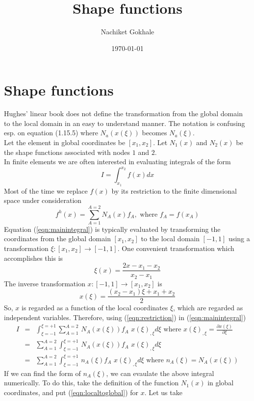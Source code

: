 \documentclass{article}
\newcommand{\beq}{\begin{equation}}
\newcommand{\eeq}{\end{equation}}
\newcommand{\ber}{\begin{eqnarray}}
\newcommand{\eer}{\end{eqnarray}}
\begin{document}
\title{Shape functions}
\author{Nachiket Gokhale}
\date{\today}
\maketitle
\section{Shape functions}
Hughes' linear book does not define the transformation from the global domain to the local domain in an easy to understand manner. The notation is confusing esp. on equation (1.15.5) where $N_a(x(\xi))$ becomes $N_a(\xi)$. \\
Let the element in global coordinates be $[x_1,x_2]$. Let $N_1(x)$ and $N_2(x)$ be the shape functions associated with nodes $1$ and $2$. \\
In finite elements we are often interested in evaluating integrals of the form
\begin{equation}
  \label{eqn:mainintegral}
  I=\int_{x_1}^{x_2}f(x)dx
\end{equation}
Most of the time we replace $f(x)$ by its restriction to the finite dimensional space under consideration
\begin{equation}
  \label{eqn:restriction}
f^h(x)=\sum_{A=1}^{A=2}N_{A}(x)f_{A},\text{ where } f_A=f(x_A)
\end{equation}
Equation (\ref{eqn:mainintegral}) is typically evaluated by transforming the coordinates from the global domain $[x_1,x_2]$ to the local domain $[-1,1]$ using a transformation $\xi:[x_1,x_2]\rightarrow[-1,1]$. One convenient transformation which accomplishes this is
\beq
\label{eqn:globaltolocal}
\xi(x) = \frac{2x -x_1 - x_2}{x_2-x_1}
\eeq
The inverse transformation $x:[-1,1]\rightarrow[x_1,x_2]$ is
\beq
\label{eqn:localtoglobal}
x(\xi) = \frac{(x_2 - x_1)\xi + x_1 + x_2}{2}
\eeq
So, $x$ is regarded as a function of the local coordinates $\xi$, which are regarded as independent variables. Therefore, using (\ref{eqn:restriction}) in (\ref{eqn:mainintegral})
\ber
I &=& \int_{\xi=-1}^{\xi=+1}\sum_{A=1}^{A=2}\,N_{A}(x(\xi))f_{A}\,\, x(\xi)_{,\xi} d\xi \text{ where } x(\xi)_{,\xi}=\frac{\partial x(\xi)}{\partial \xi} \nonumber \\
&=&  \sum_{A=1}^{A=2}\int_{\xi=-1}^{\xi=+1}\,N_{A}(x(\xi))f_{A}\,\, x(\xi)_{,\xi} d\xi \nonumber \\
&=&  \sum_{A=1}^{A=2}\int_{\xi=-1}^{\xi=+1}\,n_{A}(\xi)f_{A}\,\, x(\xi)_{,\xi} d\xi \text{ where } n_A(\xi)=N_A(x(\xi))
\eer
If we can find the form of $n_A(\xi)$, we can evaulate the above integral numerically. To do this, take the definition of the function $N_1(x)$ in global coordinates, and put (\ref{eqn:localtoglobal}) for $x$. Let us take
\end{document}
